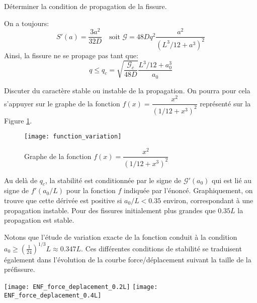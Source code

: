 \begin{questions}
\question Déterminer la condition de propagation de la fissure. 
\begin{solution}
On a toujours:
$$S'(a) = \dfrac{3a^2}{32D} \quad \text{soit } \mathcal{G}=48Dq^2\dfrac{a^2}{(L^3/12+a^3)^2}$$
Ainsi, la fissure ne se propage pas tant que:
$$q \leq q_c = \sqrt{\dfrac{\mathcal{G}_c}{48D}}\dfrac{L^3/12+a_0^3}{a_0}$$
\end{solution}
\question Discuter du caractère stable ou instable de la propagation. On pourra pour cela s'appuyer sur le graphe de la fonction $f(x) = \dfrac{x^2}{(1/12+x^3)^2}$ représenté sur la Figure \ref{fig:graphe-fonction}.
\begin{figure}
\begin{center}
\texttt{[image: function\_variation]}
\end{center}
\caption{Graphe de la fonction $f(x) = \dfrac{x^2}{(1/12+x^3)^2}$}\label{fig:graphe-fonction}
\end{figure}
\begin{solution}
Au delà de $q_c$, la stabilité est conditionnée par le signe de $\mathcal{G}'(a_0)$ qui est lié au signe de $f'(a_0/L)$ pour la fonction $f$ indiquée par l'énoncé. Graphiquement, on trouve que cette dérivée est positive si $a_0/L < 0.35$ environ, correspondant à une propagation instable. Pour des fissures initialement plus grandes que $0.35L$ la propagation est stable.

Notons que l'étude de variation exacte de la fonction conduit à la condition $a_0 \geq \left(\frac{1}{24}\right)^{1/3}L \approx 0.347L$. Ces différentes conditions de stabilité se traduisent également dans l'évolution de la courbe force/déplacement suivant la taille de la préfissure.

\begin{R_figure}
\texttt{[image: ENF\_force\_deplacement\_0.2L]}
\texttt{[image: ENF\_force\_deplacement\_0.4L]}\\
\end{R_figure}

\end{solution}
\end{questions}
